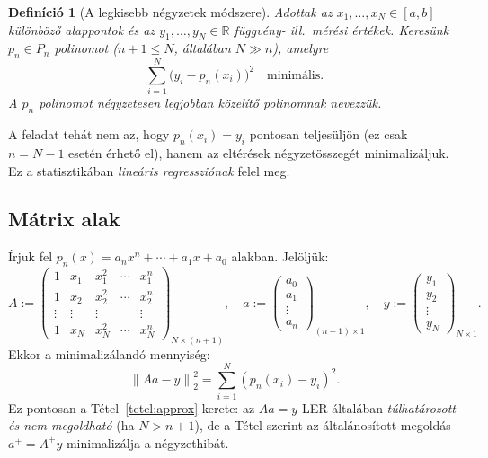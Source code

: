 \documentclass[a4paper,12pt]{article}
\theoremstyle{mydef}
\newtheorem{definicio}[tetel]{Definíció}
\newcommand{\R}{\mathbb{R}}
\newcommand{\norm}[1]{\left\|#1\right\|}
\begin{document}
\begin{mdframed}[backgroundcolor=defbg,linewidth=0pt,innertopmargin=8pt,innerbottommargin=8pt]
\begin{definicio}[A legkisebb négyzetek módszere]
Adottak az $x_1, \ldots, x_N \in [a,b]$ különböző alappontok és az
$y_1, \ldots, y_N \in \R$ függvény- ill.\ mérési értékek.
Keresünk $p_n \in P_n$ polinomot ($n+1 \le N$, általában $N \gg n$), amelyre
\[
  \sum_{i=1}^N \bigl(y_i - p_n(x_i)\bigr)^2 \quad \text{minimális.}
\]
A $p_n$ polinomot \emph{négyzetesen legjobban közelítő polinomnak} nevezzük.
\end{definicio}
\end{mdframed}

A feladat tehát nem az, hogy $p_n(x_i) = y_i$ pontosan teljesüljön (ez csak $n = N-1$ esetén
érhető el), hanem az eltérések négyzetösszegét minimalizáljuk. Ez a statisztikában
\emph{lineáris regressziónak} felel meg.

\subsection*{Mátrix alak}

Írjuk fel $p_n(x) = a_n x^n + \cdots + a_1 x + a_0$ alakban. Jelöljük:
\[
  A :=
  \begin{pmatrix}
    1 & x_1 & x_1^2 & \cdots & x_1^n \\
    1 & x_2 & x_2^2 & \cdots & x_2^n \\
    \vdots & \vdots & \vdots & & \vdots \\
    1 & x_N & x_N^2 & \cdots & x_N^n
  \end{pmatrix}_{N\times(n+1)},
  \quad
  a :=
  \begin{pmatrix} a_0 \\ a_1 \\ \vdots \\ a_n \end{pmatrix}_{(n+1)\times 1},
  \quad
  y :=
  \begin{pmatrix} y_1 \\ y_2 \\ \vdots \\ y_N \end{pmatrix}_{N\times 1}.
\]
Ekkor a minimalizálandó mennyiség:
\[
  \norm{Aa - y}_2^2 = \sum_{i=1}^N (p_n(x_i) - y_i)^2.
\]
Ez pontosan a Tétel~\ref{tetel:approx} kerete: az $Aa = y$ LER általában
\emph{túlhatározott és nem megoldható} (ha $N > n+1$), de a Tétel szerint az
általánosított megoldás $a^+ = A^+ y$ minimalizálja a négyzethibát.
\end{document}

